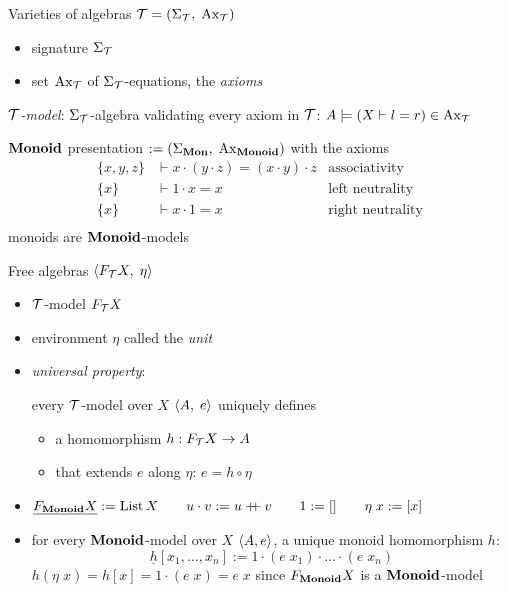 \documentclass[10pt, english, xcolor={dvipsnames}]{beamer}
\begin{document}
\begin{frame}{Varieties of algebras}
   $\mathcal{T} = (\Sigma_{\mathcal{T}},\; \operatorname{Ax}_{\mathcal{T}})$
  \begin{itemize}
    \item signature $\Sigma_{\mathcal{T}}$
    \item set $\operatorname{Ax}_{\mathcal{T}}$ of $\Sigma_{\mathcal{T}}$-equations, the \emph{axioms}
  \end{itemize}
  \emph{$\mathcal{T}$-model}: $\Sigma_{\mathcal{T}}$-algebra validating every axiom in $\mathcal{T}$: $A \models (X \vdash l = r) \in \operatorname{Ax}_{\mathcal{T}}$

  \vspace{0.5cm}
  
  $\mathbf{Monoid}$ presentation $:= (\Sigma_{\mathbf{Mon}},\; \operatorname{Ax}_{\mathbf{Monoid}})$ with the axioms
  \begin{align*}
    \{x, y, z\} &\vdash x \cdot (y \cdot z) = (x \cdot y) \cdot z &\text{associativity}\\
    \{x\} &\vdash 1 \cdot x = x &\text{left neutrality}\\
    \{x\} &\vdash x \cdot 1 = x &\text{right neutrality}\\
  \end{align*}
  monoids are $\mathbf{Monoid}$-models
\end{frame}

\begin{frame}{Free algebras}
   $\left\langle F_{\mathcal{T}} X,\; \eta \right\rangle$
  \begin{itemize}
    \item $\mathcal{T}$-model $F_{\mathcal{T}} X$
    \item environment $\eta$ called the \emph{unit}
    \item \emph{universal property}:
    
    every $\mathcal{T}$-model over $X$ $\left\langle A,\; e \right\rangle$ uniquely defines \begin{itemize}
      \item a homomorphism $h : F_{\mathcal{T}} X \to A$
      \item that extends $e$ along $\eta$: $e = h \circ \eta$
    \end{itemize}
  \end{itemize}

  \begin{itemize}
    \item $\underline{F_{\mathbf{Monoid}} X} := \operatorname{List} X \qquad u \cdot v := u \mathbin{+\mkern-7mu+} v \qquad 1 := [] \qquad \eta\; x := [x]$
    \item for every $\mathbf{Monoid}$-model over $X$ $\left\langle A, e \right\rangle$, a unique monoid homomorphism $h$: $$\underline{h} [x_1, \dots, x_n] := 1 \cdot (e\; x_1) \cdot \ldots \cdot (e\; x_n)$$ $h (\eta\; x) = h [x] = 1 \cdot (e\; x) = e\; x$ since $F_{\mathbf{Monoid}} X$ is a $\mathbf{Monoid}$-model
  \end{itemize}
\end{frame}
\end{document}
